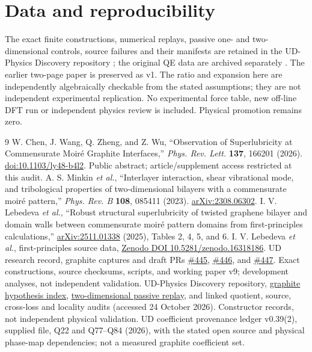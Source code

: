\documentclass[9pt,a4paper,twocolumn]{extarticle}
\begin{document}
\section*{Data and reproducibility}
The exact finite constructions, numerical replays, passive one- and two-dimensional controls, source failures and their manifests are retained in the UD-Physics Discovery repository \cite{udphysics}; the original QE data are archived separately \cite{zenodo}. The earlier two-page paper \cite{udrecord} is preserved as v1. The ratio and expansion here are independently algebraically checkable from the stated assumptions; they are not independent experimental replication. No experimental force table, new off-line DFT run or independent physics review is included. Physical promotion remains zero.

\begin{thebibliography}{9}\setlength{\itemsep}{0pt}
 W. Chen, J. Wang, Q. Zheng, and Z. Wu, ``Observation of Superlubricity at Commensurate Moir\'e Graphite Interfaces,'' \emph{Phys. Rev. Lett.} \textbf{137}, 166201 (2026). \href{https://doi.org/10.1103/ly48-b4l2}{doi:10.1103/ly48-b4l2}. Public abstract; article/supplement access restricted at this audit.
 A. S. Minkin \emph{et al.}, ``Interlayer interaction, shear vibrational mode, and tribological properties of two-dimensional bilayers with a commensurate moir\'e pattern,'' \emph{Phys. Rev. B} \textbf{108}, 085411 (2023). \href{https://arxiv.org/abs/2308.06302}{arXiv:2308.06302}.
 I. V. Lebedeva \emph{et al.}, ``Robust structural superlubricity of twisted graphene bilayer and domain walls between commensurate moir\'e pattern domains from first-principles calculations,'' \href{https://arxiv.org/abs/2511.01338}{arXiv:2511.01338} (2025), Tables 2, 4, 5, and 6.
 I. V. Lebedeva \emph{et al.}, first-principles source data, \href{https://doi.org/10.5281/zenodo.16318186}{Zenodo DOI 10.5281/zenodo.16318186}.
 UD research record, graphite captures and draft PRs \href{https://github.com/ud-tetra/UD/pull/445}{\#445}, \href{https://github.com/ud-tetra/UD/pull/446}{\#446}, and \href{https://github.com/ud-tetra/UD/pull/447}{\#447}. Exact constructions, source checksums, scripts, and working paper v9; development analyses, not independent validation.
 UD-Physics Discovery repository, \href{https://github.com/ud-tetra/UD-Physics/tree/main/experiments/graphite-superlubricity}{graphite hypothesis index}, \href{https://github.com/ud-tetra/UD-Physics/tree/main/experiments/graphite-2d-relaxation}{two-dimensional passive replay}, and linked quotient, source, cross-loss and locality audits (accessed 24 October 2026). Constructor records, not independent physical validation.
 UD coefficient provenance ledger v0.39(2), supplied file, Q22 and Q77--Q84 (2026), with the stated open source and physical phase-map dependencies; not a measured graphite coefficient set.
\end{thebibliography}
\end{document}
